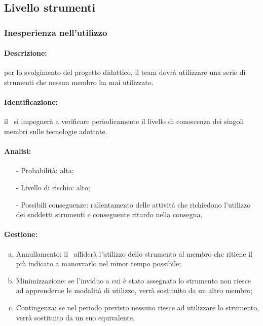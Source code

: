 \documentclass[../PianoProgetto.tex]{subfiles}
\begin{document}
\subsection{Livello strumenti}

\subsubsection{Inesperienza nell’utilizzo}

	\paragraph*{Descrizione:} per lo svolgimento del progetto didattico, il team dovrà utilizzare una serie di strumenti che nessun membro ha mai utilizzato.
	
	\paragraph*{Identificazione:} il \responsabilediprogetto\ si impegnerà a verificare periodicamente il livello di conoscenza dei singoli membri sulle tecnologie adottate.
	
	\paragraph*{Analisi:}
	\begin{itemize}
		\item[-] Probabilità: alta;
		\item[-] Livello di rischio: alto;
		\item[-] Possibili conseguenze: rallentamento delle attività che richiedono l’utilizzo dei suddetti strumenti e conseguente ritardo nella consegna.
	\end{itemize}
	
	\paragraph*{Gestione:}
	\begin{enumerate}[(a)]
		\item Annullamento: il \responsabilediprogetto\ affiderà l’utilizzo dello strumento al membro che ritiene il più indicato a manovrarlo nel minor tempo possibile;
		\item Minimizzazione: se l’inviduo a cui è stato assegnato lo strumento non riesce ad apprenderne le modalità di utilizzo, verrà sostituito da un altro membro;
		\item Contingenza: se nel periodo previsto nessuno riesce ad utilizzare lo strumento, verrà sostituito da un suo equivalente. 
	\end{enumerate}	
	
\end{document}
